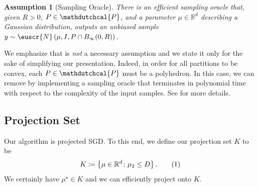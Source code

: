 \documentclass[11pt,letterpaper]{article}
\theoremstyle{plain}
\newtheorem{assumption}{Assumption}
\theoremstyle{definition}
\theoremstyle{remark}
\newcommand{\yesnum}{\addtocounter{equation}{1}\tag{\theequation}}
\newcommand{\inbrace}[1]{\ensuremath{\left\{#1\right\}}}
\newcommand{\inparen}[1]{\ensuremath{\left(#1\right)}}
\let\norm\relax
\newcommand{\norm}[1]{\ensuremath{\left\lVert #1 \right\rVert}}
\newcommand{\R}{\mathbb{R}}
\newcommand{\customcal}[1]{\euscr{#1}}
\newcommand{\cN}{\customcal{N}}
\newcommand{\hypo}[1]{\mathdutchcal{#1}}
\newcommand{\hyP}{\hypo{P}}
\newcommand{\truncatedNormal}[3]{\cN\inparen{#1,#2,#3}}
\begin{document}
{{    \begin{assumption}[Sampling Oracle]\label{asmp:samplingOracle}
        \sloppy
        There is an efficient sampling oracle that, 
        given $R > 0$,
        $P\in \hyP$,
        and a parameter $\mu\in \R^d$ describing a Gaussian distribution,
        outputs an unbiased sample $y\sim \truncatedNormal{\mu}{I}{P\cap B_\infty(0, R)}$.
    \end{assumption}
    {We emphasize that  is \emph{not} a necessary assumption and we state it only for the sake of simplifying our presentation.
    Indeed,
    in order for all partitions to be convex,
    each $P\in \hyP$ must be a polyhedron.
    In this case,
    we can remove  by implementing a sampling oracle that terminates in polynomial time with respect to the complexity of the input samples.
    See  for more details.


\subsection{Projection Set}
Our algorithm is projected SGD. To this end, we define our
 projection set $K$ to be
\[
    K\coloneqq \inbrace{\mu\in \R^d\colon \norm{\mu}_2\leq D}.
    \yesnum\label{eq:mean:projectionSet}
\]
We certainly have $\mu^\star\in K$
and we can efficiently project onto $K$.

}}}
\end{document}

